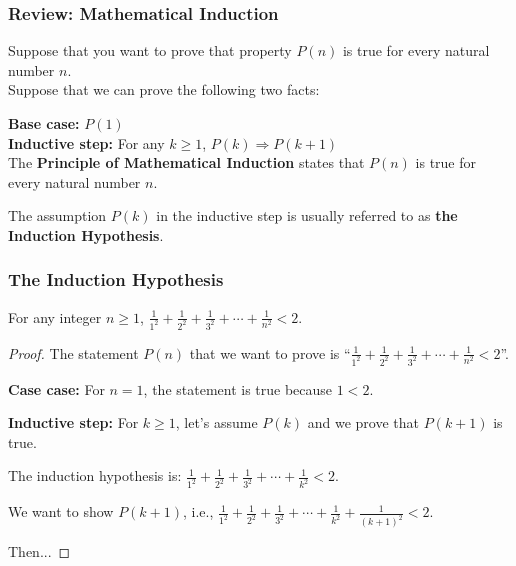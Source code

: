 

\begin{frame}\frametitle{Review: Mathematical Induction}
  \begin{tcolorbox}
    Suppose that you want to prove that property $P(n)$ is true for
    every natural number $n$.\\
    
    Suppose that we can prove the following two facts:
    
    {\bf Base case:} $P(1)$ \\
    {\bf Inductive step:} For any $k\geq 1$, $P(k)\Rightarrow P(k+1)$ \\
    
    The {\bf Principle of Mathematical Induction} states that $P(n)$
    is true for every natural number $n$.
  \end{tcolorbox}

  The assumption $P(k)$ in the inductive step is usually referred to
  as {\bf the Induction Hypothesis}.
\end{frame}

\begin{frame}\frametitle{The Induction Hypothesis}
  \begin{theorem}
    For any integer $n\geq 1$, $\frac{1}{1^2} + \frac{1}{2^2} + \frac{1}{3^2} + \cdots +\frac{1}{n^2} < 2$.
  \end{theorem}
  \pause
  \begin{proof}
    The statement $P(n)$ that we want to prove is ``$\frac{1}{1^2} + \frac{1}{2^2} + \frac{1}{3^2} + \cdots +\frac{1}{n^2} < 2$''.
    
    \pause
    \vspace{0.1in}

    {\bf Case case:} For $n=1$, the statement is true because $1<2$.

    \pause
    \vspace{0.1in}
    
    {\bf Inductive step:} For $k\geq 1$, let's assume $P(k)$ and we prove that $P(k+1)$ is true.

    \pause

    The induction hypothesis is: $\frac{1}{1^2} + \frac{1}{2^2} + \frac{1}{3^2} + \cdots +\frac{1}{k^2} < 2$.

    We want to show $P(k+1)$, i.e., $\frac{1}{1^2} + \frac{1}{2^2} + \frac{1}{3^2} + \cdots +\frac{1}{k^2}+\frac{1}{(k+1)^2} < 2$.

    Then...
  \end{proof}
\end{frame}

